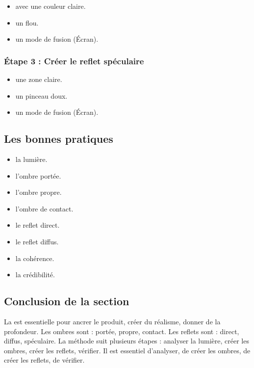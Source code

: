 \begin{itemize}
    \item {} avec une couleur claire.
    \item {} un flou.
    \item {} un mode de fusion (Écran).
\end{itemize}

\subsubsection{Étape 3 : Créer le reflet spéculaire}

\begin{itemize}
    \item {} une zone claire.
    \item {} un pinceau doux.
    \item {} un mode de fusion (Écran).
\end{itemize}

\subsection{Les bonnes pratiques}

\begin{itemize}
    \item {} la lumière.
    \item {} l'ombre portée.
    \item {} l'ombre propre.
    \item {} l'ombre de contact.
    \item {} le reflet direct.
    \item {} le reflet diffus.
    \item {} la cohérence.
    \item {} la crédibilité.
\end{itemize}

\subsection*{Conclusion de la section}

La  est essentielle pour ancrer le produit, créer du réalisme, donner de la profondeur. Les ombres sont : portée, propre, contact. Les reflets sont : direct, diffus, spéculaire. La méthode suit plusieurs étapes : analyser la lumière, créer les ombres, créer les reflets, vérifier. Il est essentiel d'analyser, de créer les ombres, de créer les reflets, de vérifier.

